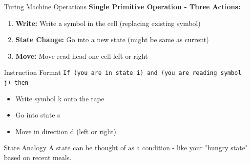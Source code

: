 \documentclass[aspectratio=169]{beamer}
\begin{document}
\begin{frame}{Turing Machine Operations}
    \textbf{Single Primitive Operation - Three Actions:}
    
    \begin{enumerate}
        \item \textbf{Write:} Write a symbol in the cell (replacing existing symbol)
        \item \textbf{State Change:} Go into a new state (might be same as current)
        \item \textbf{Move:} Move read head one cell left or right
    \end{enumerate}
    
    \vspace{0.5cm}
    \begin{block}{Instruction Format}
        \texttt{If (you are in state i) and (you are reading symbol j) then}
        \begin{itemize}
            \item Write symbol k onto the tape
            \item Go into state s
            \item Move in direction d (left or right)
        \end{itemize}
    \end{block}
    
    \vspace{0.3cm}
    \begin{exampleblock}{State Analogy}
        A state can be thought of as a condition - like your "hungry state" based on recent meals.
    \end{exampleblock}
\end{frame}
\end{document}
